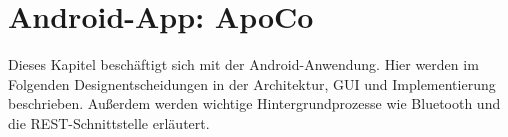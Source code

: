 

\chapter{Android-App: ApoCo}

Dieses Kapitel besch\"aftigt sich mit der Android-Anwendung.
Hier werden im Folgenden Designentscheidungen in der Architektur, GUI und Implementierung beschrieben.
Au\ss{}erdem werden wichtige Hintergrundprozesse wie Bluetooth und die REST-Schnittstelle erl\"autert.\\




















